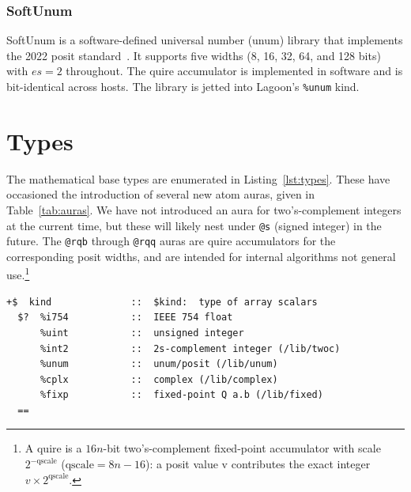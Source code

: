 \documentclass[twoside]{article}
\begin{document}
\subsubsection{SoftUnum}

SoftUnum is a software-defined universal number (unum) library that implements the 2022 posit standard~\citep{positstd2022}.  It supports five widths (8, 16, 32, 64, and 128 bits) with $es=\text{2}$ throughout.  The quire accumulator is implemented in software and is bit-identical across hosts.  The library is jetted into Lagoon's \texttt{\%unum} kind.

\section{Types}

The mathematical base types are enumerated in Listing~\ref{lst:types}.  These have occasioned the introduction of several new atom auras, given in Table~\ref{tab:auras}.  We have not introduced an aura for two's-complement integers at the current time, but these will likely nest under \texttt{@s} (signed integer) in the future.  The \texttt{@rqb} through \texttt{@rqq} auras are quire accumulators for the corresponding posit widths, and are intended for internal algorithms not general use.\footnote{A quire is a $\text{16}n$-bit two's-complement fixed-point accumulator with scale $\text{2}^{-\text{qscale}}$ ($\text{qscale} = \text{8}n-\text{16}$): a posit value v contributes the exact integer $v \times \text{2}^\text{qscale}$.}

\begin{lstlisting}[style=listingblock,
                   label=lst:types,
                   caption={Mathematical base types.  From \texttt{/sur/lagoon}.},
                   float=tb]
+$  kind              ::  $kind:  type of array scalars
  $?  %i754           ::  IEEE 754 float
      %uint           ::  unsigned integer
      %int2           ::  2s-complement integer (/lib/twoc)
      %unum           ::  unum/posit (/lib/unum)
      %cplx           ::  complex (/lib/complex)
      %fixp           ::  fixed-point Q a.b (/lib/fixed)
  ==
\end{lstlisting}
\end{document}

